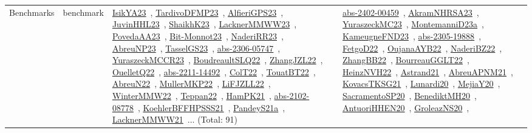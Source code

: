 {\begin{longtable}{lp{3cm}>{\raggedright\arraybackslash}p{6cm}>{\raggedright\arraybackslash}p{6cm}>{\raggedright\arraybackslash}p{8cm}}
Benchmarks & benchmark & \href{works/IsikYA23.pdf}{IsikYA23}~\cite{IsikYA23}, \href{works/TardivoDFMP23.pdf}{TardivoDFMP23}~\cite{TardivoDFMP23}, \href{works/AlfieriGPS23.pdf}{AlfieriGPS23}~\cite{AlfieriGPS23}, \href{works/JuvinHHL23.pdf}{JuvinHHL23}~\cite{JuvinHHL23}, \href{works/ShaikhK23.pdf}{ShaikhK23}~\cite{ShaikhK23}, \href{works/LacknerMMWW23.pdf}{LacknerMMWW23}~\cite{LacknerMMWW23}, \href{works/PovedaAA23.pdf}{PovedaAA23}~\cite{PovedaAA23}, \href{works/Bit-Monnot23.pdf}{Bit-Monnot23}~\cite{Bit-Monnot23}, \href{works/NaderiRR23.pdf}{NaderiRR23}~\cite{NaderiRR23}, \href{works/AbreuNP23.pdf}{AbreuNP23}~\cite{AbreuNP23}, \href{works/TasselGS23.pdf}{TasselGS23}~\cite{TasselGS23}, \href{works/abs-2306-05747.pdf}{abs-2306-05747}~\cite{abs-2306-05747}, \href{works/YuraszeckMCCR23.pdf}{YuraszeckMCCR23}~\cite{YuraszeckMCCR23}, \href{works/BoudreaultSLQ22.pdf}{BoudreaultSLQ22}~\cite{BoudreaultSLQ22}, \href{works/ZhangJZL22.pdf}{ZhangJZL22}~\cite{ZhangJZL22}, \href{works/OuelletQ22.pdf}{OuelletQ22}~\cite{OuelletQ22}, \href{works/abs-2211-14492.pdf}{abs-2211-14492}~\cite{abs-2211-14492}, \href{works/ColT22.pdf}{ColT22}~\cite{ColT22}, \href{works/TouatBT22.pdf}{TouatBT22}~\cite{TouatBT22}, \href{works/AbreuN22.pdf}{AbreuN22}~\cite{AbreuN22}, \href{works/MullerMKP22.pdf}{MullerMKP22}~\cite{MullerMKP22}, \href{works/LiFJZLL22.pdf}{LiFJZLL22}~\cite{LiFJZLL22}, \href{works/WinterMMW22.pdf}{WinterMMW22}~\cite{WinterMMW22}, \href{works/Teppan22.pdf}{Teppan22}~\cite{Teppan22}, \href{works/HamPK21.pdf}{HamPK21}~\cite{HamPK21}, \href{works/abs-2102-08778.pdf}{abs-2102-08778}~\cite{abs-2102-08778}, \href{works/KoehlerBFFHPSSS21.pdf}{KoehlerBFFHPSSS21}~\cite{KoehlerBFFHPSSS21}, \href{works/PandeyS21a.pdf}{PandeyS21a}~\cite{PandeyS21a}, \href{works/LacknerMMWW21.pdf}{LacknerMMWW21}~\cite{LacknerMMWW21}... (Total: 91) & \href{works/abs-2402-00459.pdf}{abs-2402-00459}~\cite{abs-2402-00459}, \href{works/AkramNHRSA23.pdf}{AkramNHRSA23}~\cite{AkramNHRSA23}, \href{works/YuraszeckMC23.pdf}{YuraszeckMC23}~\cite{YuraszeckMC23}, \href{works/MontemanniD23a.pdf}{MontemanniD23a}~\cite{MontemanniD23a}, \href{works/KameugneFND23.pdf}{KameugneFND23}~\cite{KameugneFND23}, \href{works/abs-2305-19888.pdf}{abs-2305-19888}~\cite{abs-2305-19888}, \href{works/FetgoD22.pdf}{FetgoD22}~\cite{FetgoD22}, \href{works/OujanaAYB22.pdf}{OujanaAYB22}~\cite{OujanaAYB22}, \href{works/NaderiBZ22.pdf}{NaderiBZ22}~\cite{NaderiBZ22}, \href{works/ZhangBB22.pdf}{ZhangBB22}~\cite{ZhangBB22}, \href{works/BourreauGGLT22.pdf}{BourreauGGLT22}~\cite{BourreauGGLT22}, \href{works/HeinzNVH22.pdf}{HeinzNVH22}~\cite{HeinzNVH22}, \href{works/Astrand21.pdf}{Astrand21}~\cite{Astrand21}, \href{works/AbreuAPNM21.pdf}{AbreuAPNM21}~\cite{AbreuAPNM21}, \href{works/KovacsTKSG21.pdf}{KovacsTKSG21}~\cite{KovacsTKSG21}, \href{works/Lunardi20.pdf}{Lunardi20}~\cite{Lunardi20}, \href{works/MejiaY20.pdf}{MejiaY20}~\cite{MejiaY20}, \href{works/SacramentoSP20.pdf}{SacramentoSP20}~\cite{SacramentoSP20}, \href{works/BenediktMH20.pdf}{BenediktMH20}~\cite{BenediktMH20}, \href{works/AntuoriHHEN20.pdf}{AntuoriHHEN20}~\cite{AntuoriHHEN20}, \href{works/GroleazNS20.pdf}{GroleazNS20}~\cite{GroleazNS20}, 
\end{longtable}}
